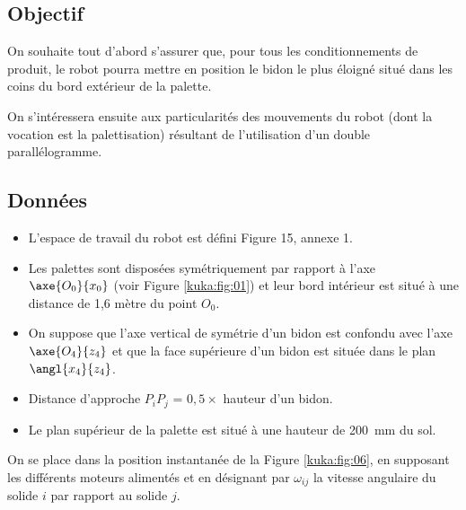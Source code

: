 \subsection{Objectif}

On souhaite tout d’abord s’assurer que, pour tous les conditionnements de produit, le robot 
pourra mettre en position le bidon le plus éloigné situé dans les coins du bord extérieur de la 
palette. 

On s’intéressera ensuite aux particularités des mouvements du robot (dont la vocation est la 
palettisation) résultant de l’utilisation d’un double parallélogramme. 

\subsection{Données} 
\begin{itemize}
\item L’espace de travail du robot est défini Figure 15, annexe 1. 
\item Les palettes sont disposées symétriquement par rapport à l’axe $\axe{O_0}{x_0}$ (voir Figure \ref{kuka:fig:01}) et leur bord intérieur est situé à une distance de 1,6 mètre du point $O_0$. 
\item On suppose que l’axe vertical de symétrie d’un bidon est confondu avec l’axe $\axe{O_4}{z_4}$
et que la face supérieure d’un bidon est située dans le plan $\angl{x_4}{z_4}$. 
\item Distance d’approche $P_iP_j$ = $0,5 \times$ hauteur d’un bidon.%
\item Le plan supérieur de la palette est situé à une hauteur de \SI{200}{mm} du sol. 
\end{itemize}







On se place dans la position instantanée de la Figure \ref{kuka:fig:06}, en supposant les 
différents moteurs alimentés et en désignant par $\omega_{ij}$ la vitesse angulaire du solide $i$ par 
rapport au solide $j$.

